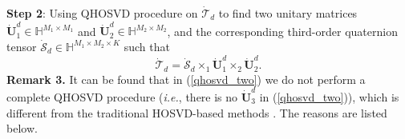 \documentclass[journal]{IEEEtran}
\begin{document}
\textbf{Step 2}: Using QHOSVD procedure on $\dot{\mathcal{T}}_{d}$ to find two unitary matrices $\dot{\mathbf{U}}_{1}^{d}\in\mathbb{H}^{M_{1}\times M_{1}}$ and $\dot{\mathbf{U}}_{2}^{d}\in\mathbb{H}^{M_{2}\times M_{2}}$, and the corresponding third-order quaternion tensor $\dot{\mathcal{S}}_{d}\in\mathbb{H}^{M_{1}\times M_{2}\times K}$ such that
\begin{equation}
\label{qhosvd_two}
\dot{\mathcal{T}}_{d}=\dot{\mathcal{S}}_{d}\times_{1}\dot{\mathbf{U}}_{1}^{d}\times_{2}\dot{\mathbf{U}}_{2}^{d}.
\end{equation}
\textbf{Remark 3.} It can be found that in (\ref{qhosvd_two}) we do not perform a complete QHOSVD procedure (\emph{i.e.}, there is no $\dot{\mathbf{U}}_{3}^{d}$ in (\ref{qhosvd_two})), which is different from the traditional HOSVD-based methods \cite{DBLP:journals/tip/LiangHLZ12,DBLP:journals/jvcir/LuoZZW17}. The reasons are listed below.
\end{document}
